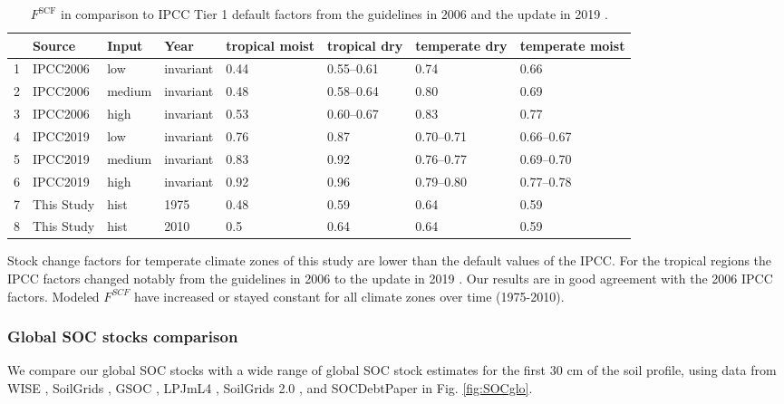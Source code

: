 \documentclass[gc, manuscript]{copernicus}
\begin{document}
\begin{table}[ht]
\centering
\caption{$F^{\mathrm{SCF}}$ in comparison to IPCC Tier 1 default factors from the guidelines in 2006 \citep{lasco_cropland_in_ipcc_2006} and the update in 2019 \citep{ogle_cropland_in_ipcc_2019}.} 
\label{tab:SCFglo}
\begin{tabular}{rlllllll}
  \hline
 & Source & Input & Year & tropical moist & tropical dry & temperate dry & temperate moist \\ 
  \hline
1 & IPCC2006 & low & invariant & 0.44 & 0.55--0.61 & 0.74 & 0.66 \\ 
  2 & IPCC2006 & medium & invariant & 0.48 & 0.58--0.64 & 0.80 & 0.69 \\ 
  3 & IPCC2006 & high & invariant & 0.53 & 0.60--0.67 & 0.83 & 0.77 \\ 
  4 & IPCC2019 & low & invariant & 0.76 & 0.87 & 0.70--0.71 & 0.66--0.67 \\ 
  5 & IPCC2019 & medium & invariant & 0.83 & 0.92 & 0.76--0.77 & 0.69--0.70 \\ 
  6 & IPCC2019 & high & invariant & 0.92 & 0.96 & 0.79--0.80 & 0.77--0.78 \\ 
  7 & This Study & hist & 1975 & 0.48 & 0.59 & 0.64 & 0.59 \\ 
  8 & This Study & hist & 2010 & 0.5 & 0.64 & 0.64 & 0.59 \\ 
   \hline
\end{tabular}
\end{table}

Stock change factors for temperate climate zones of this study are lower than the default values of the IPCC. For the tropical regions the IPCC factors changed notably from the guidelines in 2006 \citep{lasco_cropland_in_ipcc_2006} to the update in 2019 \citep{ogle_cropland_in_ipcc_2019}. Our results are in good agreement with the 2006 IPCC factors. Modeled \(F^{SCF}\) have increased or stayed constant for all climate zones over time (1975-2010).

\hypertarget{global-soc-stocks-comparison}{%
\subsubsection{Global SOC stocks comparison}\label{global-soc-stocks-comparison}}

We compare our global SOC stocks with a wide range of global SOC stock estimates for the first 30 cm of the soil profile, using data from WISE \citep{batjes_harmonized_2016}, SoilGrids \citep{hengl_soilgrids250m_2017}, GSOC \citep{fao_global_2018}, LPJmL4 \citep{schaphoff_lpjml4_2018-1}, SoilGrids 2.0 \citep{poggio_soilgrids_2021}, and SOCDebtPaper \citep{sanderman_soil_2017} in Fig. \ref{fig:SOCglo}.
\end{document}
